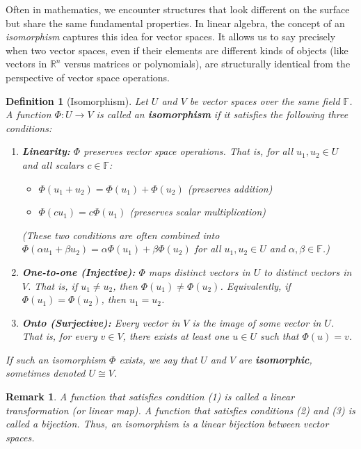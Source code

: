 \documentclass[11pt]{article}
\newtheorem{definition}[theorem]{Definition}
\newtheorem{remark}[theorem]{Remark}
\theoremstyle{definition}
\theoremstyle{remark}
\newcommand{\R}{\mathbb{R}}
\newcommand{\F}{\mathbb{F}}
\begin{document}
Often in mathematics, we encounter structures that look different on the surface but share the same fundamental properties. In linear algebra, the concept of an \emph{isomorphism} captures this idea for vector spaces. It allows us to say precisely when two vector spaces, even if their elements are different kinds of objects (like vectors in $\R^n$ versus matrices or polynomials), are structurally identical from the perspective of vector space operations.

\begin{definition}[Isomorphism]
Let $U$ and $V$ be vector spaces over the same field $\F$. A function $\Phi: U \to V$ is called an \textbf{isomorphism} if it satisfies the following three conditions:
\begin{enumerate}
    \item \textbf{Linearity:} $\Phi$ preserves vector space operations. That is, for all $u_1, u_2 \in U$ and all scalars $c \in \F$:
        \begin{itemize}
            \item $\Phi(u_1 + u_2) = \Phi(u_1) + \Phi(u_2)$ (preserves addition)
            \item $\Phi(c u_1) = c \Phi(u_1)$ (preserves scalar multiplication)
        \end{itemize}
        (These two conditions are often combined into $\Phi(\alpha u_1 + \beta u_2) = \alpha \Phi(u_1) + \beta \Phi(u_2)$ for all $u_1, u_2 \in U$ and $\alpha, \beta \in \F$.)
    \item \textbf{One-to-one (Injective):} $\Phi$ maps distinct vectors in $U$ to distinct vectors in $V$. That is, if $u_1 \neq u_2$, then $\Phi(u_1) \neq \Phi(u_2)$. Equivalently, if $\Phi(u_1) = \Phi(u_2)$, then $u_1 = u_2$.
    \item \textbf{Onto (Surjective):} Every vector in $V$ is the image of some vector in $U$. That is, for every $v \in V$, there exists at least one $u \in U$ such that $\Phi(u) = v$.
\end{enumerate}
If such an isomorphism $\Phi$ exists, we say that $U$ and $V$ are \textbf{isomorphic}, sometimes denoted $U \cong V$.
\end{definition}

\begin{remark}
A function that satisfies condition (1) is called a \emph{linear transformation} (or linear map). A function that satisfies conditions (2) and (3) is called a \emph{bijection}. Thus, an isomorphism is a linear bijection between vector spaces.
\end{remark}
\end{document}
